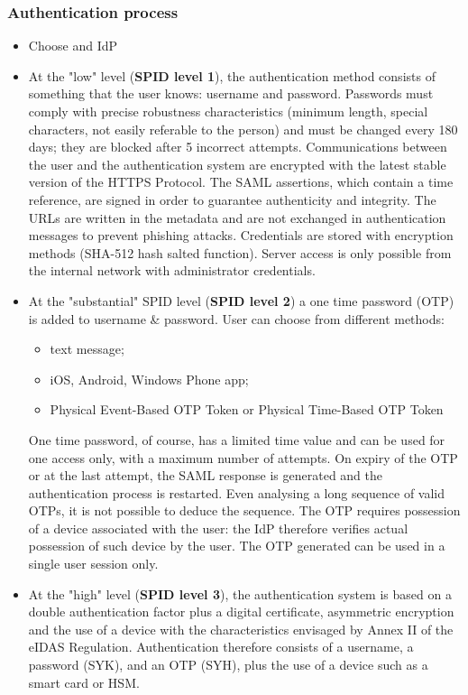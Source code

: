 \documentclass[a4paper, 10pt, titlepage]{article}
\begin{document}
\subsubsection{Authentication process}
\begin{itemize}
\item Choose and IdP
\item At the "low" level (\textbf{SPID level 1}), the authentication method consists of something that the user knows: username and password. Passwords must comply with precise robustness characteristics (minimum length, special characters, not easily referable to the person) and must be changed every 180 days; they are blocked after 5 incorrect attempts. Communications between the user and the authentication system are encrypted with the latest stable version of the HTTPS Protocol. The SAML assertions, which contain a time reference, are signed in order to guarantee authenticity and integrity. The URLs are written in the metadata and are not exchanged in authentication messages to prevent phishing attacks. Credentials are stored with encryption methods (SHA-512 hash salted function). Server access is only possible from the internal network with administrator credentials.
\item At the "substantial" SPID level (\textbf{SPID level 2}) a one time password (OTP) is added to username \& password. User can choose from different methods: 
\begin{itemize}
\item text message;
\item iOS, Android, Windows Phone app;
\item Physical Event-Based OTP Token or Physical Time-Based OTP Token
\end{itemize} 
One time password, of course, has a limited time value and can be used for one access only, with a maximum number of attempts. On expiry of the OTP or at the last attempt, the SAML response is generated and the authentication process is restarted. Even analysing a long sequence of valid OTPs, it is not possible to deduce the sequence. The OTP requires possession of a device associated with the user: the IdP therefore verifies actual possession of such device by the user. The OTP generated can be used in a single user session only.
\item At the "high" level (\textbf{SPID level 3}), the authentication system is based on a double authentication factor plus a digital certificate, asymmetric encryption and the use of a device with the characteristics envisaged by Annex II of the eIDAS Regulation. Authentication therefore consists of a username, a password (SYK), and an OTP (SYH), plus the use of a device such as a smart card or HSM.
\end{itemize}
\end{document}
